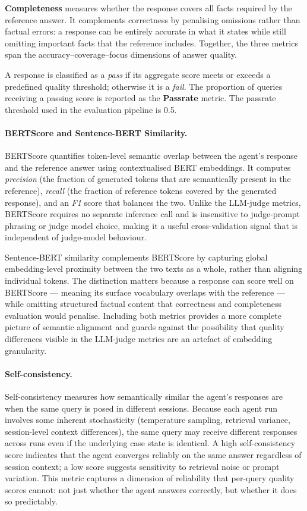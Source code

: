 \textbf{Completeness} measures whether the response covers all facts required by the reference answer. It complements correctness by penalising omissions rather than factual errors: a response can be entirely accurate in what it states while still omitting important facts that the reference includes. Together, the three metrics span the accuracy--coverage--focus dimensions of answer quality.

A response is classified as a \emph{pass} if its aggregate score meets or exceeds a predefined quality threshold; otherwise it is a \emph{fail}. The proportion of queries receiving a passing score is reported as the \textbf{Passrate} metric.
The passrate threshold used in the evaluation pipeline is 0.5.

\bigskip

\paragraph{BERTScore and Sentence-BERT Similarity.}
BERTScore \cite{zhang2020bertscoreevaluatingtextgeneration} quantifies token-level semantic overlap between the agent's response and the reference answer using contextualised BERT embeddings. It computes \emph{precision} (the fraction of generated tokens that are semantically present in the reference), \emph{recall} (the fraction of reference tokens covered by the generated response), and an \emph{F1} score that balances the two. Unlike the LLM-judge metrics, BERTScore requires no separate inference call and is insensitive to judge-prompt phrasing or judge model choice, making it a useful cross-validation signal that is independent of judge-model behaviour.

Sentence-BERT similarity complements BERTScore by capturing global embedding-level proximity between the two texts as a whole, rather than aligning individual tokens. The distinction matters because a response can score well on BERTScore --- meaning its surface vocabulary overlaps with the reference --- while omitting structured factual content that correctness and completeness evaluation would penalise. Including both metrics provides a more complete picture of semantic alignment and guards against the possibility that quality differences visible in the LLM-judge metrics are an artefact of embedding granularity.

\paragraph{Self-consistency.}
Self-consistency measures how semantically similar the agent's responses are when the same query is posed in different sessions. Because each agent run involves some inherent stochasticity (temperature sampling, retrieval variance, session-level context differences), the same query may receive different responses across runs even if the underlying case state is identical. A high self-consistency score indicates that the agent converges reliably on the same answer regardless of session context; a low score suggests sensitivity to retrieval noise or prompt variation. This metric captures a dimension of reliability that per-query quality scores cannot: not just whether the agent answers correctly, but whether it does so predictably.

